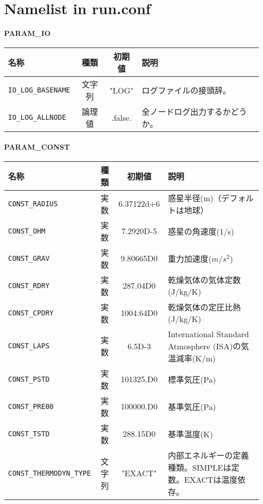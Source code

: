 \chapter{Namelist in run.conf}

\subsubsection{PARAM\_IO}
\begin{tabularx}{150mm}{|l|c|c|X|} \hline
 \rowcolor[gray]{0.9} 名称 & 種類 & 初期値 & 説明 \\ \hline
 \verb|IO_LOG_BASENAME| & 文字列 & "LOG" & ログファイルの接頭辞。 \\ \hline
 \verb|IO_LOG_ALLNODE| & 論理値 & .false. & 全ノードログ出力するかどうか。 \\ \hline
\end{tabularx}


\subsubsection{PARAM\_CONST}
\begin{tabularx}{150mm}{|l|c|c|X|} \hline
 \rowcolor[gray]{0.9} 名称 & 種類 & 初期値 & 説明 \\ \hline
 \verb|CONST_RADIUS| & 実数 & 6.37122d+6 & 惑星半径(m)（デフォルトは地球） \\ \hline
 \verb|CONST_OHM| & 実数 & 7.2920D-5 & 惑星の角速度(1/s) \\ \hline
 \verb|CONST_GRAV| & 実数 & 9.80665D0 & 重力加速度($m/s^{2}$) \\ \hline
 \verb|CONST_RDRY| & 実数 & 287.04D0 & 乾燥気体の気体定数 (J/kg/K)\\ \hline
 \verb|CONST_CPDRY| & 実数 & 1004.64D0 & 乾燥気体の定圧比熱 (J/kg/K) \\ \hline
 \verb|CONST_LAPS| & 実数 & 6.5D-3 & International Standard Atmosphere (ISA)の気温減率(K/m) \\ \hline
 \verb|CONST_PSTD| & 実数 & 101325.D0 & 標準気圧(Pa) \\ \hline
 \verb|CONST_PRE00| & 実数 & 100000.D0 & 基準気圧(Pa) \\ \hline
 \verb|CONST_TSTD| & 実数 & 288.15D0 & 基準温度(K) \\ \hline
 \verb|CONST_THERMODYN_TYPE| & 文字列 & "EXACT" & 内部エネルギーの定義種類。SIMPLEは定数。EXACTは温度依存。 \\ \hline
\end{tabularx}

